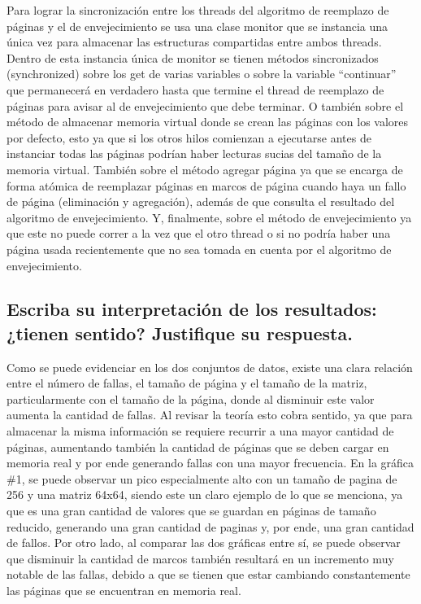 \documentclass[a4paper]{article}
\begin{document}
Para lograr la sincronización entre los threads del algoritmo de reemplazo de páginas y el de envejecimiento se usa una clase monitor que se instancia una única vez para almacenar las estructuras compartidas entre ambos threads. Dentro de esta instancia única de monitor se tienen métodos sincronizados (synchronized) sobre los get de varias variables o sobre la variable “continuar” que permanecerá en verdadero hasta que termine el thread de reemplazo de páginas para avisar al de envejecimiento que debe terminar. O también sobre el método de almacenar memoria virtual donde se crean las páginas con los valores por defecto, esto ya que si los otros hilos comienzan a ejecutarse antes de instanciar todas las páginas podrían haber lecturas sucias del tamaño de la memoria virtual. También sobre el método agregar página ya que se encarga de forma atómica de reemplazar páginas en marcos de página cuando haya un fallo de página (eliminación y agregación), además de que consulta el resultado del algoritmo de envejecimiento. Y, finalmente, sobre el método de envejecimiento ya que este no puede correr a la vez que el otro thread o si no podría haber una página usada recientemente que no sea tomada en cuenta por el algoritmo de envejecimiento.

\subsection{Escriba su interpretación de los resultados: ¿tienen sentido? Justifique su respuesta.}

Como se puede evidenciar en los dos conjuntos de datos, existe una clara relación entre el número de fallas, el tamaño de página y el tamaño de la matriz, particularmente con el tamaño de la página, donde al disminuir este valor aumenta la cantidad de fallas. Al revisar la teoría esto cobra sentido, ya que para almacenar la misma información se requiere recurrir a una mayor cantidad de páginas, aumentando también la cantidad de páginas que se deben cargar en memoria real y por ende generando fallas con una mayor frecuencia. En la gráfica \#1, se puede observar un pico especialmente alto con un tamaño de pagina de 256 y una matriz 64x64, siendo este un claro ejemplo de lo que se menciona, ya que es una gran cantidad de valores que se guardan en páginas de tamaño reducido, generando una gran cantidad de paginas y, por ende, una gran cantidad de fallos. Por otro lado, al comparar las dos gráficas entre sí, se puede observar que disminuir la cantidad de marcos también resultará en un incremento muy notable de las fallas, debido a que se tienen que estar cambiando constantemente las páginas que se encuentran en memoria real. 
\end{document}
